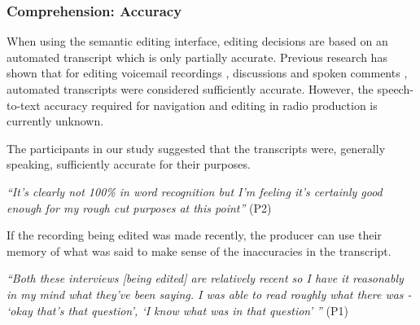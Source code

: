 





\subsubsection{Comprehension: Accuracy}
When using the semantic editing interface, editing decisions are based on an
automated transcript which is only partially accurate. Previous research has shown that for editing
voicemail recordings \citep{Whittaker2004}, discussions \citep{Sivaraman2016} and spoken comments \citep{Yoon2014},
automated transcripts were considered sufficiently accurate. However, the speech-to-text accuracy required for
navigation and editing in radio production is currently unknown.

The participants in our study suggested that the transcripts were, generally speaking, sufficiently accurate for their
purposes.

\textit{``It's clearly not 100\% in word recognition but I'm feeling it's
  certainly good enough for my rough cut purposes at this point''} (P2)

If the recording being edited was made recently, the producer can use their
memory of what was said to make sense of the inaccuracies in the
transcript.

\textit{``Both these interviews [being edited] are relatively recent so I have
  it reasonably in my mind what they've been saying. I was able to read roughly
  what there was - `okay that's that question', `I know what was in that
  question' ''} (P1)

